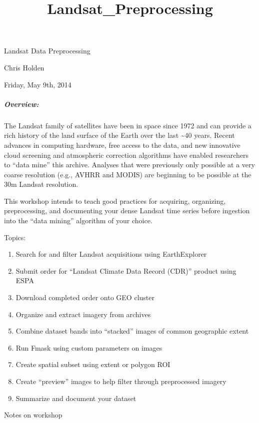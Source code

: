 \documentclass{article}
\title{Landsat\_Preprocessing}
\begin{document}
    
    
    \maketitle
    
    

    
    Landsat Data Preprocessing

Chris Holden

Friday, May 9th, 2014

\subparagraph{Overview:}

The Landsat family of satellites have been in space since 1972 and can
provide a rich history of the land surface of the Earth over the last
\textasciitilde{}40 years. Recent advances in computing hardware, free
access to the data, and new innovative cloud screening and atmospheric
correction algorithms have enabled researchers to ``data mine'' this
archive. Analyses that were previously only possible at a very coarse
resolution (e.g., AVHRR and MODIS) are beginning to be possible at the
30m Landsat resolution.

This workshop intends to teach good practices for acquiring, organizing,
preprocessing, and documenting your dense Landsat time series before
ingestion into the ``data mining'' algorithm of your choice.

Topics:

\begin{enumerate}
\def\labelenumi{\arabic{enumi}.}
\itemsep1pt\parskip0pt
\item
  Search for and filter Landsat acquisitions using EarthExplorer
\item
  Submit order for ``Landsat Climate Data Record (CDR)'' product using
  ESPA
\item
  Download completed order onto GEO cluster
\item
  Organize and extract imagery from archives
\item
  Combine dataset bands into ``stacked'' images of common geographic
  extent
\item
  Run Fmask using custom parameters on images
\item
  Create spatial subset using extent or polygon ROI
\item
  Create ``preview'' images to help filter through preprocessed imagery
\item
  Summarize and document your dataset
\end{enumerate}

Notes on workshop
\end{document}
